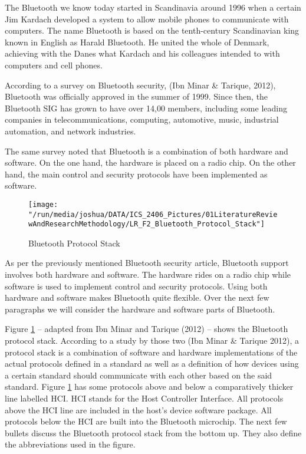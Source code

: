 \documentclass[12pt,svgnames,smaller]{article} %
\begin{document}
\begin{enumerate}
		The Bluetooth we know today started in Scandinavia around 1996 when a certain Jim Kardach developed a system to allow mobile phones to communicate with computers. The name Bluetooth is based on the tenth-century Scandinavian king known in English as Harald Bluetooth. He united the whole of Denmark, achieving with the Danes what Kardach and his colleagues intended to with computers and cell phones.  
		
		According to a survey on Bluetooth security, (Ibn Minar \& Tarique, 2012), Bluetooth was officially approved in the summer of 1999. Since then, the Bluetooth SIG has grown to have over 14,00 members, including some leading companies in telecommunications, computing, automotive, music, industrial automation, and network industries.
		
		The same survey noted that Bluetooth is a combination of both hardware and software. On the one hand, the hardware is placed on a radio chip. On the other hand, the main control and security protocols have been implemented as software.
		
		\begin{figure}
			\centering
			\texttt{[image: "/run/media/joshua/DATA/ICS\_2406\_Pictures/01LiteratureReviewAndResearchMethodology/LR\_F2\_Bluetooth\_Protocol\_Stack"]}
			\caption{Bluetooth Protocol Stack}
			\label{fig:LiteratureReview-Figure2}
		\end{figure}
		
		As per the previously mentioned Bluetooth security article, Bluetooth support involves both hardware and software. The hardware rides on a radio chip while software is used to implement control and security protocols. Using both hardware and software makes Bluetooth quite flexible. Over the next few paragraphs we will consider the hardware and software parts of Bluetooth.
		
		Figure \ref{fig:LiteratureReview-Figure2} – adapted from Ibn Minar and Tarique (2012) –  shows the Bluetooth protocol stack. According to a study by those two (Ibn Minar \& Tarique 2012), a protocol stack is a combination of software and hardware implementations of the actual protocols defined in a standard as well as a definition of how devices using a certain standard should communicate with each other based on the said standard. Figure \ref{fig:LiteratureReview-Figure2} has some protocols above and below a comparatively thicker line labelled HCI. HCI stands for the Host Controller Interface. All protocols above the HCI line are included in the host’s device software package. All protocols below the HCI are built into the Bluetooth microchip. The next few bullets discuss the Bluetooth protocol stack from the bottom up. They also define the abbreviations used in the figure.
		

\end{enumerate}
\end{document}
